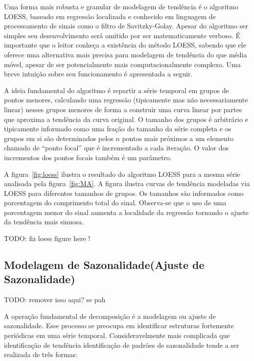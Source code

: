 Uma forma mais robusta e granular de modelagem de tendência é o algoritmo
LOESS, baseado em regressão localizada e conhecido em linguagem de processamento
de sinais como o filtro de Savitzky-Golay. Apesar do algoritmo ser simples
seu desenvolvimento será omitido por ser matematicamente verboso. É importante
que o leitor conheça a existência do método LOESS, sabendo que ele oferece uma
alternativa mais precisa para modelagem de tendência do que média móvel,
apesar de ser potencialmente mais computacionalmente complexo. Uma breve
intuição sobre seu funcionamento é apresentada a seguir.

A ideia fundamental do algoritmo é repartir a série temporal em grupos de
pontos menores, calculando uma regressão (tipicamente mas não necessariamente
linear) nesses grupos menores de forma a construir uma curva linear por partes
que aproxima a tendência da curva original. O tamanho dos grupos é arbitrário
e tipicamente informado como uma fração do tamanho da série completa e os grupos
em si são determinados pelos $n$ pontos mais próximos a um elemento chamado de
``ponto focal'' que é incrementado a cada iteração. O valor dos incrementos dos
pontos focais também é um parâmetro.

A figura~\ref{fig:loess} ilustra o resultado do algoritmo LOESS para a mesma
série analisada pela figura~\ref{fig:MA}. A figura ilustra curvas de tendência
modeladas via LOESS para diferentes tamanhos de grupos. Os tamanhos são
informados como porcentagem do comprimento total do sinal. Observa-se que o uso
de uma porcentagem menor do sinal aumenta a localidade da regressão tornando o
ajuste da tendência mais sinuosa.

TODO: fiz loess figure here !

\subsection{Modelagem de Sazonalidade(Ajuste de Sazonalidade)}

TODO: remover isso aqui? se pah

A operação fundamental de decomposição é a modelagem ou ajuste de sazonalidade.
Esse processo se preocupa em identificar estruturas fortemente periódicas em
uma série temporal. Consideravelmente mais complicada que identificação de
tendência identificação de padrões de sazonalidade tende a ser realizada de
três formas:

